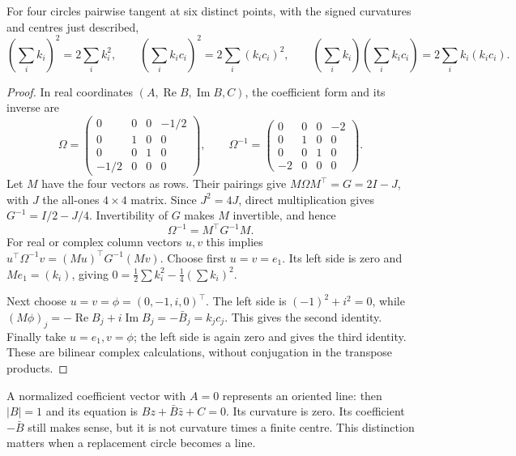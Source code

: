 \begin{theorem}\label{geometry:thm:descartes}
For four circles pairwise tangent at six distinct points, with the signed curvatures and centres just described,
\[
\left(\sum_i k_i\right)^2=2\sum_i k_i^2,\qquad
\left(\sum_i k_ic_i\right)^2=2\sum_i(k_ic_i)^2,
\qquad
\left(\sum_i k_i\right)\left(\sum_i k_ic_i\right)=2\sum_i k_i(k_ic_i).
\]
\end{theorem}
\begin{proof}
In real coordinates $(A,\operatorname{Re}B,\operatorname{Im}B,C)$, the coefficient form and its inverse are
\[
\Omega=\begin{pmatrix}0&0&0&-1/2\\0&1&0&0\\0&0&1&0\\-1/2&0&0&0\end{pmatrix},
\qquad
\Omega^{-1}=\begin{pmatrix}0&0&0&-2\\0&1&0&0\\0&0&1&0\\-2&0&0&0\end{pmatrix}.
\]
Let $M$ have the four vectors as rows. Their pairings give
$M\Omega M^\top=G=2I-J$, with $J$ the all-ones $4\times4$ matrix. Since $J^2=4J$, direct multiplication gives $G^{-1}=I/2-J/4$. Invertibility of $G$ makes $M$ invertible, and hence
\[
\Omega^{-1}=M^\top G^{-1}M.
\]
For real or complex column vectors $u,v$ this implies
$u^\top\Omega^{-1}v=(Mu)^\top G^{-1}(Mv)$. Choose first $u=v=e_1$. Its left side is zero and $Me_1=(k_i)$, giving
$0=\tfrac12\sum k_i^2-\tfrac14(\sum k_i)^2$.

Next choose $u=v=\phi=(0,-1,i,0)^\top$. The left side is $(-1)^2+i^2=0$, while $(M\phi)_j=-\operatorname{Re}B_j+i\operatorname{Im}B_j=-\bar B_j=k_jc_j$. This gives the second identity. Finally take $u=e_1,v=\phi$; the left side is again zero and gives the third identity. These are bilinear complex calculations, without conjugation in the transpose products.
\end{proof}

A normalized coefficient vector with $A=0$ represents an oriented line: then $|B|=1$ and its equation is $Bz+\bar B\bar z+C=0$. Its curvature is zero. Its coefficient $-\bar B$ still makes sense, but it is not curvature times a finite centre. This distinction matters when a replacement circle becomes a line.

